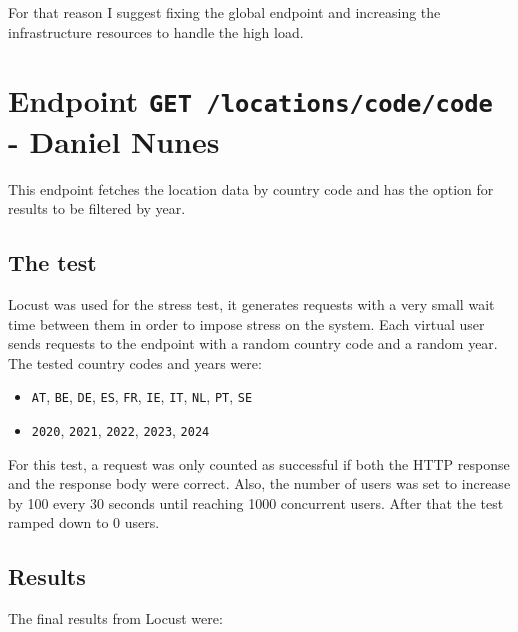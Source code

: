 For that reason I suggest fixing the global endpoint and increasing the infrastructure resources to handle the high load.

\section{Endpoint \texttt{GET /locations/code/{code}} - Daniel Nunes}
This endpoint fetches the location data by country code and has the option for results to be filtered by year.

\subsection{The test}

Locust was used for the stress test, it generates requests with a very small wait time between them in order to impose stress on the system. Each virtual user sends requests to the endpoint with a random country code and a random year. The tested country codes and years were:

\begin{itemize}
    \item \texttt{AT}, \texttt{BE}, \texttt{DE}, \texttt{ES}, \texttt{FR}, \texttt{IE}, \texttt{IT}, \texttt{NL}, \texttt{PT}, \texttt{SE}
    \item \texttt{2020}, \texttt{2021}, \texttt{2022}, \texttt{2023}, \texttt{2024}
\end{itemize}

For this test, a request was only counted as successful if both the HTTP response and the response body were correct. Also, the number of users was set to increase by 100 every 30 seconds until reaching 1000 concurrent users. After that the test ramped down to 0 users.

\newpage

\subsection{Results}
The final results from Locust were:

